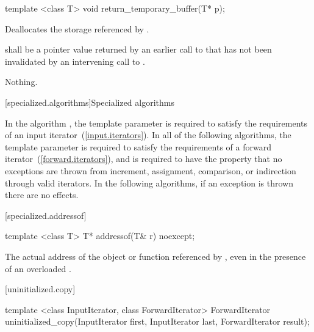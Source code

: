 %
\begin{itemdecl}
template <class T> void return_temporary_buffer(T* p);
\end{itemdecl}

\begin{itemdescr}
\pnum
\effects
Deallocates the storage referenced by .

\pnum
\requires
{} shall be a pointer value returned by an earlier call to
 that has not been invalidated by
an intervening call to .

\pnum
\throws
Nothing.
\end{itemdescr}

[specialized.algorithms]{Specialized algorithms}

\pnum
In the algorithm , the template parameter
 is required to satisfy the requirements of an input
iterator~(\ref{input.iterators}). In all of the following algorithms,
the template parameter  is required to satisfy the
requirements of a forward iterator~(\ref{forward.iterators}),
and is required to have the property that no exceptions are thrown
from increment, assignment, comparison, or indirection through valid iterators.
In the following algorithms, if an exception is thrown there are no effects.

[specialized.addressof]{}

%
\begin{itemdecl}
template <class T> T* addressof(T& r) noexcept;
\end{itemdecl}

\begin{itemdescr}
\pnum
\returns The actual address of the object or function referenced by , even in the
presence of an overloaded .
\end{itemdescr}


[uninitialized.copy]{}

%
\begin{itemdecl}
template <class InputIterator, class ForwardIterator>
  ForwardIterator uninitialized_copy(InputIterator first, InputIterator last,
                                     ForwardIterator result);
\end{itemdecl}

